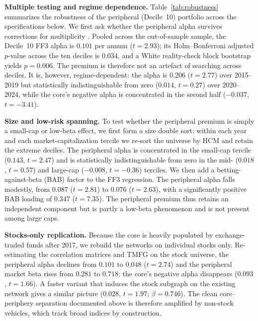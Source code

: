 \documentclass[fleqn]{rbfin}
\begin{document}
\noindent\textbf{Multiple testing and regime dependence.} Table~\ref{tab:robustness} summarizes the robustness of the peripheral (Decile~10) portfolio across the specifications below. We first ask whether the peripheral alpha survives corrections for multiplicity \citep{harvey2016and}. Pooled across the out-of-sample sample, the Decile~10 FF3 alpha is $0.101$ per annum ($t=2.93$); its Holm--Bonferroni adjusted $p$-value across the ten deciles is $0.034$, and a White reality-check block bootstrap yields $p=0.006$. The premium is therefore not an artefact of searching across deciles. It is, however, regime-dependent: the alpha is $0.206$ ($t=2.77$) over 2015--2019 but statistically indistinguishable from zero ($0.014$, $t=0.27$) over 2020--2024, while the core's negative alpha is concentrated in the second half ($-0.037$, $t=-3.41$).

\noindent\textbf{Size and low-risk spanning.} To test whether the peripheral premium is simply a small-cap or low-beta effect, we first form a size double sort: within each year and each market-capitalization tercile we re-sort the universe by HCM and retain the extreme deciles. The peripheral alpha is concentrated in the small-cap tercile ($0.143$, $t=2.47$) and is statistically indistinguishable from zero in the mid- ($0.018$, $t=0.57$) and large-cap ($-0.008$, $t=-0.36$) terciles. We then add a betting-against-beta (BAB) factor \citep{frazzini2014betting} to the FF3 regression. The peripheral alpha falls modestly, from $0.087$ ($t=2.81$) to $0.076$ ($t=2.63$), with a significantly positive BAB loading of $0.347$ ($t=7.35$). The peripheral premium thus retains an independent component but is partly a low-beta phenomenon and is not present among large caps.

\noindent\textbf{Stocks-only replication.} Because the core is heavily populated by exchange-traded funds after 2017, we rebuild the networks on individual stocks only. Re-estimating the correlation matrices and TMFG on the stock universe, the peripheral alpha declines from $0.101$ to $0.048$ ($t=2.74$) and the peripheral market beta rises from $0.281$ to $0.718$; the core's negative alpha disappears ($0.093$, $t=1.66$). A faster variant that induces the stock subgraph on the existing network gives a similar picture ($0.028$, $t=1.97$; $\beta=0.746$). The clean core--periphery separation documented above is therefore amplified by non-stock vehicles, which track broad indices by construction.
\end{document}
